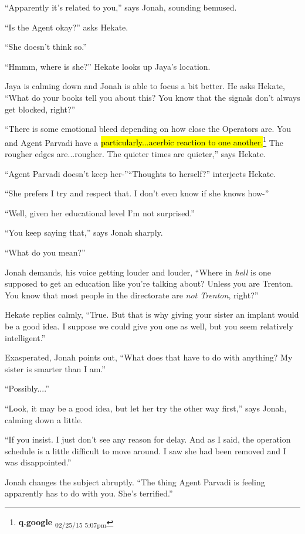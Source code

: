 ``Apparently it's related to you,'' says Jonah, sounding bemused.

``Is the Agent okay?'' asks Hekate.

``She doesn't think so.''

``Hmmm, where is she?'' Hekate looks up Jaya's location.

Jaya is calming down and Jonah is able to focus a bit better.  He asks Hekate, ``What do your books tell you about this?  You know that the signals don't always get blocked, right?''

``There is some emotional bleed depending on how close the Operators are.  You and Agent Parvadi have a \hl{particularly...acerbic reaction to one another.}\footnote{\textbf{q.google } \textsubscript{02/25/15 5:07pm}}  The rougher edges are...rougher.  The quieter times are quieter,'' says Hekate.

``Agent Parvadi doesn't keep her-''``Thoughts to herself?'' interjects Hekate.

``She prefers I try and respect that. I don't even know if she knows how-''

``Well, given her educational level I'm not surprised.''

``You keep saying that,'' says Jonah sharply.

``What do you mean?''

Jonah demands, his voice getting louder and louder, ``Where in \textit{hell} is one supposed to get an education like you're talking about?  Unless you are Trenton.  You know that most people in the directorate are \textit{not Trenton}, right?''

Hekate replies calmly, ``True.  But that is why giving your sister an implant would be a good idea.  I suppose we could give you one as well, but you seem relatively intelligent.''

Exasperated, Jonah points out, ``What does that have to do with anything?  My sister is smarter than I am.''

``Possibly....''

``Look, it may be a good idea, but let her try the other way first,'' says Jonah, calming down a little.

``If you insist.  I just don't see any reason for delay. And as I said, the operation schedule is a little difficult to move around.  I saw she had been removed and I was disappointed.''



Jonah changes the subject abruptly.  ``The thing Agent Parvadi is feeling apparently has to do with  you.  She's terrified.''

